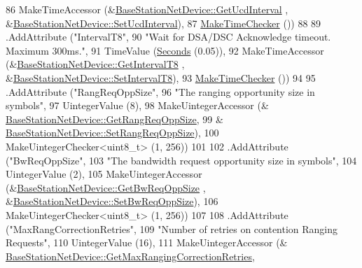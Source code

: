 \begin{DoxyCode}
86                    MakeTimeAccessor (&\hyperlink{classns3_1_1BaseStationNetDevice_a243e57353bdb33661ebe3c11ac9caf3c}{BaseStationNetDevice::GetUcdInterval}
      , &\hyperlink{classns3_1_1BaseStationNetDevice_a1896b839f0841674d6f625e584258aee}{BaseStationNetDevice::SetUcdInterval}),
87                    \hyperlink{group__time_ga7032965bd4afa578691d88c09e4481c1}{MakeTimeChecker} ())
88 
89     .AddAttribute (\textcolor{stringliteral}{"IntervalT8"},
90                    \textcolor{stringliteral}{"Wait for DSA/DSC Acknowledge timeout. Maximum 300ms."},
91                    TimeValue (\hyperlink{group__timecivil_ga33c34b816f8ff6628e33d5c8e9713b9e}{Seconds} (0.05)),
92                    MakeTimeAccessor (&\hyperlink{classns3_1_1BaseStationNetDevice_aec24bb5b99a70a4214636c14e688f10c}{BaseStationNetDevice::GetIntervalT8}
      , &\hyperlink{classns3_1_1BaseStationNetDevice_a6c903218d294b9ebd4960b4a6d954ba5}{BaseStationNetDevice::SetIntervalT8}),
93                    \hyperlink{group__time_ga7032965bd4afa578691d88c09e4481c1}{MakeTimeChecker} ())
94 
95     .AddAttribute (\textcolor{stringliteral}{"RangReqOppSize"},
96                    \textcolor{stringliteral}{"The ranging opportunity size in symbols"},
97                    UintegerValue (8),
98                    MakeUintegerAccessor (&
      \hyperlink{classns3_1_1BaseStationNetDevice_ae0acc0e22045ec42b7e636d63920e6eb}{BaseStationNetDevice::GetRangReqOppSize},
99                                          &
      \hyperlink{classns3_1_1BaseStationNetDevice_a18b2299fbf0343a958f8ced2565211fa}{BaseStationNetDevice::SetRangReqOppSize}),
100                    MakeUintegerChecker<uint8\_t> (1, 256))
101 
102     .AddAttribute (\textcolor{stringliteral}{"BwReqOppSize"},
103                    \textcolor{stringliteral}{"The bandwidth request opportunity size in symbols"},
104                    UintegerValue (2),
105                    MakeUintegerAccessor (&\hyperlink{classns3_1_1BaseStationNetDevice_a6b179c4e0445fd6ba8e8c7b10e2a16ac}{BaseStationNetDevice::GetBwReqOppSize}
      , &\hyperlink{classns3_1_1BaseStationNetDevice_a15e99613d0e8b0fa3017244b14b13963}{BaseStationNetDevice::SetBwReqOppSize}),
106                    MakeUintegerChecker<uint8\_t> (1, 256))
107 
108     .AddAttribute (\textcolor{stringliteral}{"MaxRangCorrectionRetries"},
109                    \textcolor{stringliteral}{"Number of retries on contention Ranging Requests"},
110                    UintegerValue (16),
111                    MakeUintegerAccessor (&
      \hyperlink{classns3_1_1BaseStationNetDevice_a4fb4a490c641a0e22ee45742f02a39c9}{BaseStationNetDevice::GetMaxRangingCorrectionRetries},

\end{DoxyCode}
